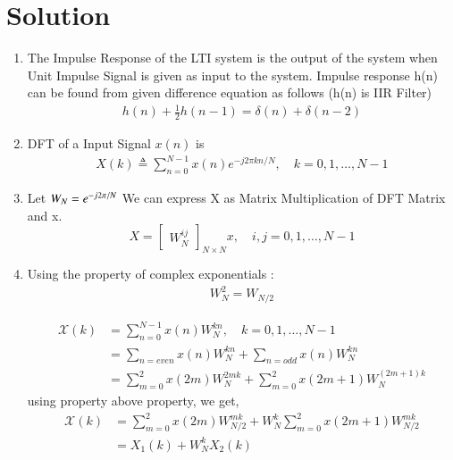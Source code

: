 \documentclass[journal,12pt,twocolumn]{IEEEtran}
\renewcommand\thesection{\arabic{section}}
\begin{document}
\section{Solution}
\begin{enumerate}[label=\thesection.\arabic*.,ref=\thesection.\theenumi]
\item
The Impulse Response of the LTI system is the output of the system when Unit Impulse Signal is given as input to the system.
Impulse response h(n) can be found from given difference equation as follows (h(n) is IIR Filter)
\begin{align}
    h(n) + \frac{1}{2}h(n-1) = \delta(n) + \delta(n-2)	
    \label{eq:equation4}
\end{align}

\item
DFT of a Input Signal $x(n)$ is 
\begin{align}
X(k) \triangleq \sum_{n=0}^{N-1} x(n) e^{-j 2 \pi k n / N}, \quad k=0,1, \ldots, N-1
\end{align}

\item
Let $W_{N} = e^{-j2\pi/N} \\$ 
We can express X as Matrix Multiplication of DFT Matrix and x.
\begin{equation}
X = 
\begin{bmatrix}
W^{ij}_{N} 
\end{bmatrix}_{N \times N}
x, \quad i,j = 0,1, \ldots, N-1
\end{equation}





\item
Using the property of complex exponentials :
\begin{align}
	 W^{2}_{N} =  W_{N/2}  
\end{align}

\begin{align}
\mathcal X(k) &=  \sum_{n=0}^{N-1} x(n)W^{kn}_{N}, \quad k=0,1, \ldots, N-1 \\
&= \sum_{n=even} x(n)W^{kn}_{N} + \sum_{n=odd} x(n)W^{kn}_{N} \\
&= \sum_{m=0}^{2} x(2m)W^{2mk}_{N} + \sum_{m=0}^{2} x(2m+1)W^{(2m+1)k}_{N} 
\end{align}
using property above property, we get,
\begin{align}
\mathcal X(k) &= \sum_{m=0}^{2} x(2m)W^{mk}_{N/2} + W^{k}_{N} \sum_{m=0}^{2} x(2m+1)W^{mk}_{N/2} \\
&= X_{1}(k) + W^{k}_{N}X_{2}(k)
\end{align}


\end{enumerate}
\end{document}
